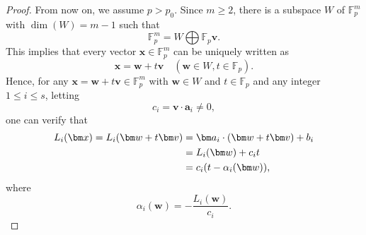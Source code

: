 \documentclass[12pt]{amsart}
\def\a{{\bm a}}
\def\v{{\bm v}}
\def\w{{\bm w}}
\def\x{{\bm x}}
\theoremstyle{plain}
\theoremstyle{remark}
\begin{document}
\begin{proof}
		From now on, we assume $p>p_0$. Since $m\ge2$, there is a subspace $W$ of $\mathbb{F}_p^m$ with $\dim(W)=m-1$ such that 
		$$\mathbb{F}_p^m=W\bigoplus\mathbb{F}_p\v.$$
		This implies that every vector $\x\in\mathbb{F}_p^m$ can be uniquely written as 
		$$\x=\w+t\v \quad (\w\in W, t\in\mathbb{F}_p).$$
		Hence, for any $\x=\w+t\v\in\mathbb{F}_p^m$ with $\w\in W$ and $t\in\mathbb{F}_p$ and any integer $1\le i\le s$, letting 
		\begin{equation}\label{Eq. definition of ci}
			c_i=\v\cdot\a_i\neq 0,
		\end{equation}
		one can verify that 
		\begin{align}\label{Eq. expression of Li}
			L_i(\x)=L_i(\w+t\v)
&=\a_i\cdot (\w+t\v)+b_i\notag\\
&=L_i(\w)+c_it\notag\\
&=c_i(t-\alpha_i(\w)),
		\end{align}
where 
      \begin{equation}\label{Eq. definition of alpha i}
	\alpha_i(\w)=-\frac{L_i(\w)}{c_i}.
       \end{equation}



\end{proof}
\end{document}
